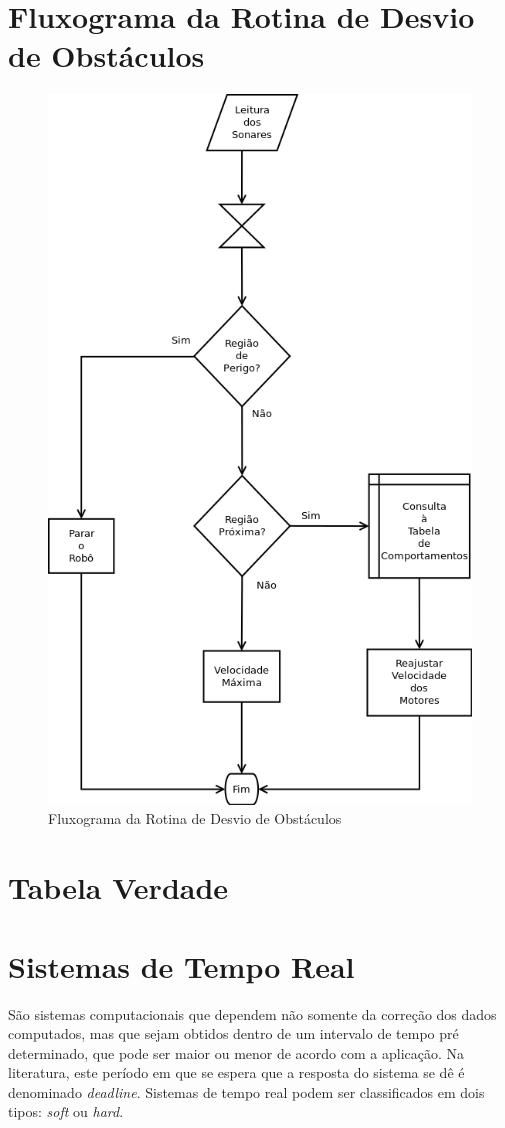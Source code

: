  \section{Fluxograma da Rotina de Desvio de Obstáculos}
  \begin{figure}[H]
    \centering
    \includegraphics[width=0.8 \linewidth]{../../Imagens/ObstAvoid.png}
    \caption{Fluxograma da Rotina de Desvio de Obstáculos}
    \label{ObstAvoid}
  \end{figure}
 \pagebreak

 \section{Tabela Verdade}


\section{Sistemas de Tempo Real}
São sistemas computacionais que dependem não somente da correção dos dados computados, mas que sejam obtidos dentro de um intervalo 
de tempo 
pré determinado, que pode ser maior ou menor de acordo com a aplicação.
Na literatura, este período em que se espera que a resposta do sistema se dê é denominado \textit{deadline}.
Sistemas de tempo real podem ser classificados em dois tipos: \textit{soft} ou \textit{hard}.

